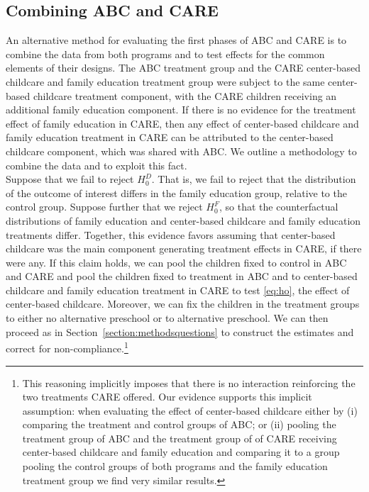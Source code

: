 \subsection{Combining ABC and CARE}

\noindent An alternative method for evaluating the first phases of ABC and CARE is to combine the data from both programs and to test effects for the common elements of their designs. The ABC treatment group and the CARE center-based childcare and family education treatment group were subject to the same center-based childcare treatment component, with the CARE children receiving an additional family education component. If there is no evidence for the treatment effect of family education in CARE, then any effect of center-based childcare and family education treatment in CARE can be attributed to the center-based childcare component, which was shared with ABC. We outline a methodology to combine the data and to exploit this fact.\\

\noindent Suppose that we fail to reject $H_{0}^D$. That is, we fail to reject that the distribution of the outcome of interest differs in the family education group, relative to the control group. Suppose further that we reject $H_{0}^F$, so that the counterfactual distributions of family education and center-based childcare and family education treatments differ. Together, this evidence favors assuming that center-based childcare was the main component generating treatment effects in CARE, if there were any. If this claim holds, we can pool the children fixed to control in ABC and CARE and pool the children fixed to treatment in ABC and to center-based childcare and family education treatment in CARE to test \eqref{eq:ho}, the effect of center-based childcare. Moreover, we can fix the children in the treatment groups to either no alternative preschool or to alternative preschool. We can then proceed as in Section~\ref{section:methodsquestions} to construct the estimates and correct for non-compliance.\footnote{This reasoning implicitly imposes that there is no interaction reinforcing the two treatments CARE offered. Our evidence supports this implicit assumption: when evaluating the effect of center-based childcare either by (i) comparing the treatment and control groups of ABC; or (ii) pooling the treatment group of ABC and the treatment group of of CARE receiving center-based childcare and family education and comparing it to a group pooling the control groups of both programs and the family education treatment group we find very similar results.}\\

